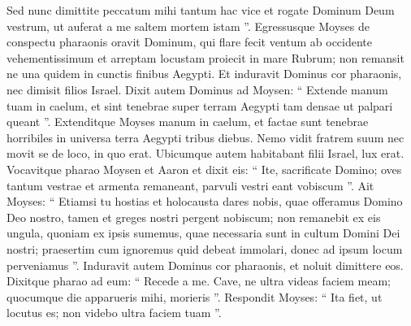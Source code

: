 \begin{biblechapter}
\begin{biblechapter}
\begin{biblechapter}
\begin{biblechapter}
\begin{biblechapter}
\begin{biblechapter}
\begin{biblechapter}
\begin{biblechapter}
\begin{biblechapter}
\begin{biblechapter}
\verse Sed nunc dimittite peccatum mihi tantum hac vice et rogate Dominum Deum vestrum, ut auferat a me saltem mortem istam ”. 
\verse Egressusque Moyses de conspectu pharaonis oravit Dominum, 
\verse qui flare fecit ventum ab occidente vehementissimum et arreptam locustam proiecit in mare Rubrum; non remansit ne una quidem in cunctis finibus Aegypti. 
\verse Et induravit Dominus cor pharaonis, nec dimisit filios Israel. 
\verse Dixit autem Dominus ad Moysen: “ Extende manum tuam in caelum, et sint tenebrae super terram Aegypti tam densae ut palpari queant ”. 
\verse Extenditque Moyses manum in caelum, et factae sunt tenebrae horribiles in universa terra Aegypti tribus diebus. 
\verse Nemo vidit fratrem suum nec movit se de loco, in quo erat. Ubicumque autem habitabant filii Israel, lux erat.
 \verse Vocavitque pharao Moysen et Aaron et dixit eis: “ Ite, sacrificate Domino; oves tantum vestrae et armenta remaneant, parvuli vestri eant vobiscum ”. 
\verse Ait Moyses: “ Etiamsi tu hostias et holocausta dares nobis, quae offeramus Domino Deo nostro, 
\verse tamen et greges nostri pergent nobiscum; non remanebit ex eis ungula, quoniam ex ipsis sumemus, quae necessaria sunt in cultum Domini Dei nostri; praesertim cum ignoremus quid debeat immolari, donec ad ipsum locum perveniamus ”.
 \verse Induravit autem Dominus cor pharaonis, et noluit dimittere eos. 
\verse Dixitque pharao ad eum: “ Recede a me. Cave, ne ultra videas faciem meam; quocumque die apparueris mihi, morieris ”. 
\verse Respondit Moyses: “ Ita fiet, ut locutus es; non videbo ultra faciem tuam ”.
 

\end{biblechapter}
\end{biblechapter}
\end{biblechapter}
\end{biblechapter}
\end{biblechapter}
\end{biblechapter}
\end{biblechapter}
\end{biblechapter}
\end{biblechapter}
\end{biblechapter}

